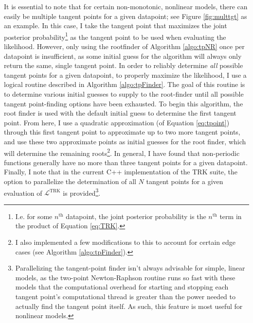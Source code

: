 It is essential to note that for certain non-monotonic, nonlinear models, there can easily be multiple tangent points for a given datapoint; see Figure \ref{fig:multtgt} as an example. In this case, I take the tangent point that maximizes the joint posterior probability\footnote{I.e. for some $n^\text{th}$ datapoint, the joint posterior probability is the $n^\text{th}$ term in the product of Equation \eqref{eq:TRK}.} as the tangent point to be used when evaluating the likelihood. However, only using the rootfinder of Algorithm \ref{algo:tpNR} once per datapoint is insufficient, as some initial guess for the algorithm will always only return the same, single tangent point. In order to reliably determine \textit{all} possible tangent points for a given datapoint, to properly maximize the likelihood, I use a logical routine described in Algorithm \ref{algo:tpFinder}. The goal of this routine is to determine various initial guesses to supply to the root-finder until all possible tangent point-finding options have been exhausted. To begin this algorithm, the root finder is used with the default initial guess to determine the first tangent point. From here, I use a quadratic approximation (of Equation \eqref{eq:tpoint}) through this first tangent point to approximate up to two more tangent points, and use these two approximate points as initial guesses for the root finder, which will determine the remaining roots\footnote{I also implemented a few modifications to this to account for certain edge cases (see Algorithm \ref{algo:tpFinder}).}. In general, I have found that non-periodic functions generally have no more than three tangent points for a given datapoint. Finally, I note that in the current C++ implementation of the TRK suite, the option to parallelize the determination of all $N$ tangent points for a given evaluation of $\mathcal{L}^\text{TRK}$ is provided\footnote{Parallelizing the tangent-point finder isn't always advisable for simple, linear models, as the two-point Newton-Raphson routine runs so fast with these models that the computational overhead for starting and stopping each tangent point's computational thread is greater than the power needed to actually find the tangent point itself. As such, this feature is most useful for nonlinear models.}.
